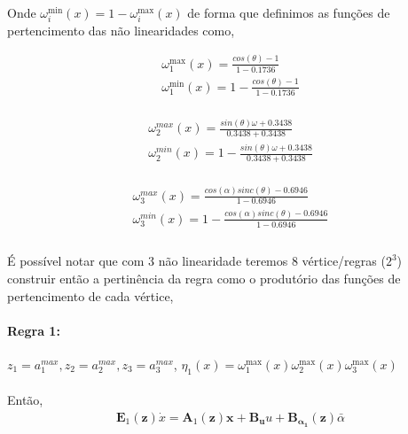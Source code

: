 \documentclass[a4paper,10pt]{article}
\begin{document}
\paragraph{}Onde $\omega_{i}^{\min}(x) = 1 - \omega_{i}^{\max}(x)$ de forma que definimos as funções de pertencimento das não linearidades como,
\noindent \begin{minipage}{.25 \linewidth}
	\begin{gather}
	\omega_{1}^{\max}(x)  =  \frac{cos(\theta) - 1}{1-0.1736} \\
		\omega_{1}^{\min}(x) = 1 - \frac{cos(\theta) - 1}{1-0.1736} \\	
	\end{gather}
\end{minipage}
\hfill
\begin{minipage}{.25 \linewidth}
	\begin{gather}
		\omega_{2}^{max}(x) = \frac{sin(\theta)\omega + 0.3438}{0.3438 + 0.3438} \\
		\omega_{2}^{min}(x) = 1- \frac{sin(\theta)\omega + 0.3438}{0.3438 + 0.3438} \\	
	\end{gather}
\end{minipage}
\hfill
\begin{minipage}{.25 \linewidth}
	\begin{gather}
		\omega_{3}^{max}(x) = \frac{cos(\alpha)sinc(\theta) - 0.6946}{1-0.6946}  \\
		\omega_{3}^{min}(x) = 1-\frac{cos(\alpha)sinc(\theta) - 0.6946}{1-0.6946} \\	
	\end{gather}
\end{minipage}
\paragraph{}É possível notar que com 3 não linearidade teremos 8 vértice/regras ($2^{3}$) construir então a pertinência da regra como o produtório das funções de pertencimento de cada vértice,
\paragraph{Regra 1:} $z_1 = a_1^{max}, z_2 = a_2^{max}, z_3 = a_3^{max}$, $\eta_1(x) = \omega_{1}^{\max}(x)\omega_{2}^{\max}(x)\omega_{3}^{\max}(x) $
\paragraph{}Então, 
\begin{gather}
	\bm{E}_1(\bm{z})\dot{x} = \bm{A}_1(\bm{z})\bm{x} + \bm{B_u}u + \bm{B_{\alpha_{1}}}(\bm{z})\bar{\alpha}
\end{gather} 
\end{document}
